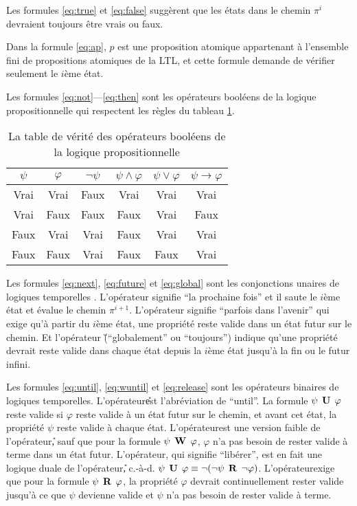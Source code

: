 Les formules \ref{eq:true} et \ref{eq:false} suggèrent que les états dans le chemin $\pi^i$ devraient toujours être vrais ou faux.

Dans la formule \ref{eq:ap}, $p$ est une proposition atomique appartenant à l'ensemble fini de propositions atomiques de la LTL, et cette formule demande de vérifier seulement le $i$ème état.

Les formules \ref{eq:not}---\ref{eq:then} sont les opérateurs booléens de la logique propositionnelle qui respectent les règles du tableau \ref{table:prologic}.

\begin{table}[h]
\centering
\begin{tabular}{|c|c|c|c|c|c|}
\hline
$\psi$ & $\varphi$ & $\neg\psi$ & $\psi \wedge \varphi$ & $\psi \vee \varphi$ & $\psi \rightarrow \varphi$ \\
\hline
Vrai & Vrai & Faux & Vrai & Vrai & Vrai \\
\hline
Vrai & Faux & Faux & Faux & Vrai & Faux \\
\hline
Faux & Vrai & Vrai & Faux & Vrai & Vrai \\
\hline
Faux & Faux & Vrai & Faux & Faux & Vrai \\
\hline
\end{tabular}
\caption{La table de vérité des opérateurs booléens de la logique propositionnelle}
\label{table:prologic}
\end{table}

Les formules \ref{eq:next}, \ref{eq:future} et \ref{eq:global} sont les conjonctions unaires de logiques temporelles . L'opérateur \X signifie ``la prochaine fois'' et il saute le $i$ème état et évalue le chemin $\pi^{i + 1}$. L'opérateur \F signifie ``parfois dans l'avenir'' qui exige qu'à partir du $i$ème état, une propriété reste valide dans un état futur sur le chemin. Et l'opérateur \G (``globalement'' ou ``toujours'') indique qu'une propriété devrait reste valide dans chaque état depuis la $i$ème état jusqu'à la fin ou le futur infini.

Les formules \ref{eq:until}, \ref{eq:wuntil} et \ref{eq:release} sont les opérateurs binaires de logiques temporelles. L'opérateur\U est l'abréviation de ``until''. La formule $\psi \mathrel{\mbox{\,\textbf{U}}}\, \varphi$ reste valide si $\varphi$ reste valide à un état futur sur le chemin, et avant cet état, la propriété $\psi$ reste valide à chaque état. L'opérateur\W est une version faible de l'opérateur\U, sauf que pour la formule $\psi \mathrel{\mbox{\,\textbf{W}}}\, \varphi$, $\varphi$ n'a pas besoin de rester valide à terme dans un état futur. L'opérateur\R, qui signifie ``libérer'', est en fait une logique duale de l'opérateur\U, c.-à-d. $\psi \mathrel{\mbox{\,\textbf{U}}}\, \varphi \equiv \neg (\neg \psi \mathrel{\mbox{\,\textbf{R}}}\, \neg \varphi)$. L'opérateur\R exige que pour la formule $\psi \mathrel{\mbox{\,\textbf{R}}}\, \varphi$, la propriété $\varphi$ devrait continuellement rester valide jusqu'à ce que $\psi$ devienne valide et $\psi$ n'a pas besoin de rester valide à terme.

